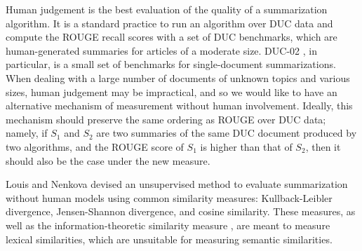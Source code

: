 \documentclass[a4paper,twoside]{article}
\begin{document}
Human judgement is the best evaluation of the quality of a summarization algorithm. %
It is a standard practice to run an algorithm over DUC data and
compute the ROUGE recall scores with a set of DUC benchmarks,
which are human-generated summaries for articles of a moderate size.
DUC-02 \cite{DUC02}, in particular, is a small set of benchmarks for single-document summarizations.
When dealing with a large number of documents of unknown topics and various sizes, human judgement may be
impractical, and so
we would like to have an alternative mechanism of measurement %
without human involvement.
Ideally, this mechanism should preserve the same ordering as %
ROUGE over DUC data; namely,
if $S_1$ and $S_2$ are two summaries of the same DUC document %
produced by two algorithms,
and the ROUGE score of $S_1$ is higher than that of $S_2$, then it should also be the case under the new measure.

Louis and Nenkova \cite{Louis:2009} devised an unsupervised method to
evaluate summarization without human models using
common similarity measures: Kullback-Leibler divergence, Jensen-Shannon divergence, and  cosine similarity.
%
%
These measures, %
as well as the information-theoretic similarity measure \cite{Aslam03},
are meant to measure lexical similarities, which are unsuitable for measuring semantic similarities.
\end{document}
